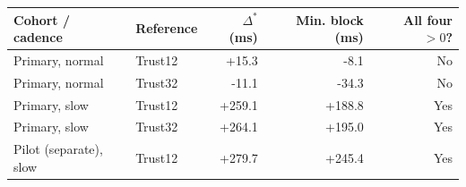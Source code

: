 \begin{table}[H]
\begin{tabular}{llrrr}
\midrule
Cohort / cadence & Reference & $\Delta^*$ (ms) & Min. block (ms) & All four $>0$?\\
\midrule
Primary, normal & Trust12 & +15.3 & -8.1 & No\\
Primary, normal & Trust32 & -11.1 & -34.3 & No\\
Primary, slow & Trust12 & +259.1 & +188.8 & Yes\\
Primary, slow & Trust32 & +264.1 & +195.0 & Yes\\
Pilot (separate), slow & Trust12 & +279.7 & +245.4 & Yes\\
\bottomrule
\end{tabular}
\end{table}
